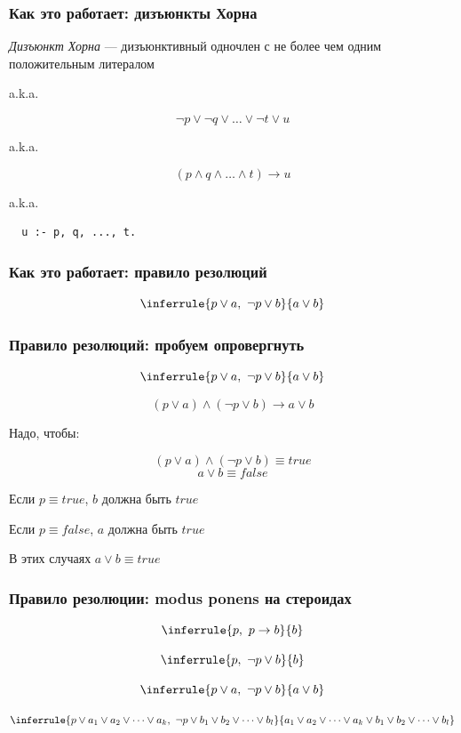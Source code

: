 \documentclass{beamer}
\begin{document}
\begin{frame}[fragile]
  \frametitle{Как это работает: дизъюнкты Хорна}
\textit{Дизъюнкт Хорна} --- дизъюнктивный одночлен с не более чем одним положительным литералом
\begin{center}
  a.k.a.
\end{center}
\[
  \neg p \vee \neg q \vee \dots \vee \neg t \vee u
\]
\begin{center}
  a.k.a.
\end{center}
\[
  (p \wedge q \wedge \dots \wedge t) \to u
\]
\begin{center}
  a.k.a.
\end{center}
\begin{center}
  \begin{minipage}{0.35\textwidth}
    \begin{verbatim}
  u :- p, q, ..., t.
    \end{verbatim}
  \end{minipage}
\end{center}

\end{frame}

\begin{frame}[fragile]
  \frametitle{Как это работает: правило резолюций}
\[\inferrule{p \vee a, \ \neg p \vee b}{a \vee b}\]
\end{frame}

\begin{frame}[fragile]
  \frametitle{Правило резолюций: пробуем опровергнуть}
  \[\inferrule{p \vee a, \ \neg p \vee b}{a \vee b}\]

\[
  (p \vee a) \wedge (\neg p \vee b) \to a \vee b
\]
\begin{center}
Надо, чтобы:
\end{center}
\[
  (p \vee a) \wedge (\neg p \vee b) \equiv true
\]
\[
  a \vee b \equiv false
\]


\begin{center}
  Если $p \equiv true$, $b$ должна быть $true$

  Если $p \equiv false$, $a$ должна быть $true$

  В этих случаях $a \vee b \equiv true$
\end{center}

\end{frame}

\begin{frame}[fragile]
  \frametitle{Правило резолюции: modus ponens на стероидах}
  \[\inferrule{p, \ p \to b}{b}\]

  \[\inferrule{p, \ \neg p \vee b}{b}\]

  \[\inferrule{p \vee a, \ \neg p \vee b}{a \vee b}\]

  \[\inferrule{p \vee a_1 \vee a_2 \vee \dots \vee a_k, \ \neg p \vee b_1 \vee b_2 \vee \dots \vee b_l}{a_1 \vee a_2 \vee \dots \vee a_k \vee b_1 \vee b_2 \vee \dots \vee b_l}\]
\end{frame}
\end{document}
